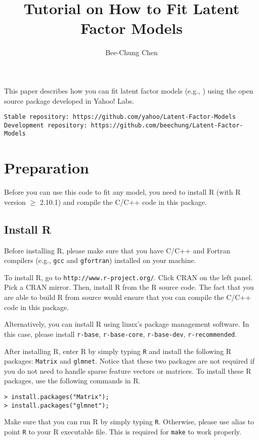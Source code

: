 \documentclass[10pt]{article}
\begin{document}
\title{Tutorial on How to Fit Latent Factor Models}
\author{Bee-Chung Chen}
\maketitle

This paper describes how you can fit latent factor models (e.g., \cite{rlfm:kdd09,bst:kdd11,gmf:recsys11}) using the open source package developed in Yahoo! Labs.

{\small\begin{verbatim}
Stable repository: https://github.com/yahoo/Latent-Factor-Models
Development repository: https://github.com/beechung/Latent-Factor-Models
\end{verbatim}}

\section{Preparation}

Before you can use this code to fit any model, you need to install R (with R version $\geq$ 2.10.1) and compile the C/C++ code in this package.

\subsection{Install R}

Before installing R, please make sure that you have C/C++ and Fortran compilers (e.g., {\tt gcc} and {\tt gfortran}) installed on your machine.

To install R, go to {\tt http://www.r-project.org/}.  Click CRAN on the left panel.  Pick a CRAN mirror.  Then, install R from the R source code.  The fact that you are able to build R from source would ensure that you can compile the C/C++ code in this package.

Alternatively, you can install R using linux's package management software.  In this case, please install {\tt r-base}, {\tt r-base-core}, {\tt r-base-dev}, {\tt r-recommended}.

After installing R, enter R by simply typing {\tt R} and install the following R packages: {\tt Matrix} and {\tt glmnet}.  Notice that these two packages are not required if you do not need to handle sparse feature vectors or matrices.  To install these R packages, use the following commands in R.
{\small\begin{verbatim}
> install.packages("Matrix");
> install.packages("glmnet");
\end{verbatim}}
\noindent Make sure that you can run R by simply typing {\tt R}.  Otherwise, please use alias to point {\tt R} to your R executable file.  This is required for {\tt make} to work properly.
\end{document}

